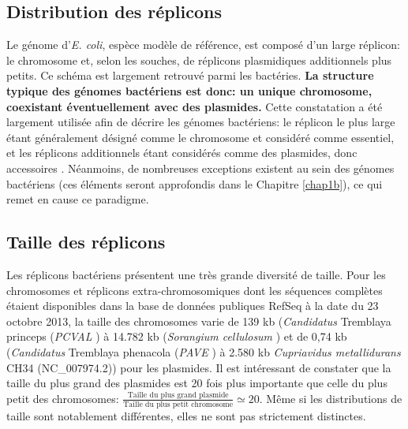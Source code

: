  
 \subsection{Distribution des réplicons}
Le génome d'\textit{E. coli}, espèce modèle de référence, est composé d'un large réplicon: le chromosome et, selon les souches, de réplicons plasmidiques additionnels plus petits. Ce schéma est largement retrouvé parmi les bactéries. \textbf{La structure typique des génomes bactériens est donc: un unique chromosome, coexistant éventuellement avec des plasmides.} Cette constatation a été largement utilisée afin de décrire les génomes bactériens: le réplicon le plus large étant généralement désigné comme le chromosome et considéré comme essentiel, et les réplicons additionnels étant considérés comme des plasmides, donc accessoires \citep{casjens1998diverse}. Néanmoins, de nombreuses exceptions existent au sein des génomes bactériens (ces éléments seront approfondis dans le Chapitre \ref{chap1b}), ce qui remet en cause ce paradigme. 


\subsection{Taille des réplicons}
	Les réplicons bactériens présentent une très grande diversité de taille. Pour les chromosomes et réplicons extra-chromosomiques dont les séquences complètes étaient disponibles dans la base de données publiques RefSeq à la date du 23 octobre 2013, la taille des chromosomes varie de 139 kb (\textit{Candidatus} Tremblaya princeps (\textit{PCVAL} \citep{lopez2011complete}) à 14.782 kb (\textit{Sorangium cellulosum} \citep{han2013extraordinary}) et de 0,74 kb (\textit{Candidatus} Tremblaya phenacola (\textit{PAVE} \citep{husnik2013horizontal}) à 2.580 kb \textit{Cupriavidus metallidurans} CH34 (NC\_007974.2)) pour les plasmides. Il est intéressant de constater que la taille du plus grand des plasmides est 20 fois plus importante que celle du plus petit des chromosomes: $\frac{\textrm{Taille du plus grand plasmide}}{\textrm{Taille du plus petit chromosome}}\simeq 20$. Même si les distributions de taille sont notablement différentes, elles ne sont pas strictement distinctes.
	
	 
